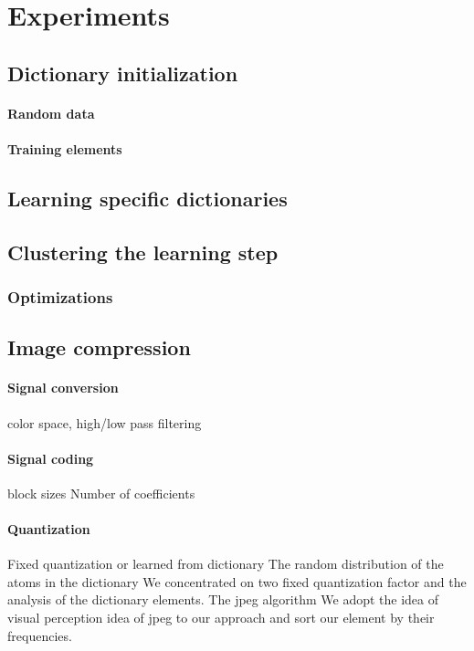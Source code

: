 \section{Experiments}

\subsection{Dictionary initialization}
\paragraph{Random data} 
\paragraph{Training elements}


\subsection{Learning specific dictionaries}


\subsection{Clustering the learning step}
\subsubsection*{Optimizations}


\subsection{Image compression}
\paragraph{Signal conversion}
color space, high/low pass filtering

\paragraph{Signal coding}
block sizes
Number of coefficients


\paragraph{Quantization}
Fixed quantization or learned from dictionary
The random distribution of the atoms in the dictionary 
We concentrated on two fixed quantization factor and the analysis of the dictionary elements.
The jpeg algorithm 
We adopt the idea of visual perception idea of jpeg to our approach and sort our element by their frequencies.

